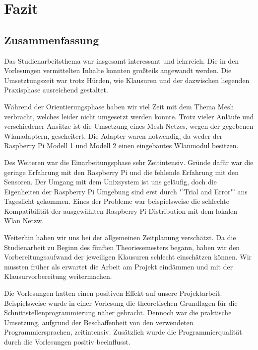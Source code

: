 \chapter{Fazit}
%
\section{Zusammenfassung}
	Das Studienarbeitsthema war insgesamt interessant und lehrreich. Die in den Vorlesungen vermittelten Inhalte konnten großteils angewandt werden. Die Umsetztungszeit war trotz Hürden, wie Klausuren und der dazwischen liegenden Praxisphase ausreichend gestaltet. 
	
	Während der	Orientierungsphase haben wir viel Zeit mit dem Thema Mesh verbracht, welches leider nicht umgesetzt werden konnte. Trotz vieler Anläufe und verschiedener Ansätze ist die Umsetzung eines Mesh Netzes, wegen der gegebenen Wlanadaptern, gescheitert. Die Adapter waren notwendig, da weder der Raspberry Pi Modell 1 und Modell 2 einen eingebautes Wlanmodul besitzen. 
	
	Des Weiteren war die Einarbeitungsphase sehr Zeitintensiv. Gründe dafür war die geringe Erfahrung mit den Raspberry Pi und die fehlende Erfahrung mit den Sensoren. Der Umgang mit dem Unixsystem ist uns geläufig, doch die Eigenheiten der Raspberry Pi Umgebung sind erst durch "'Trial and Error"' ans Tageslicht gekommen. Eines der Probleme war beispielsweise die schlechte Kompatibilität der ausgewählten Raspberry Pi Distribution mit dem lokalen Wlan Netzw. 
	
	Weiterhin haben wir uns bei der allgemeinen Zeitplanung verschätzt. Da die Studienarbeit zu Beginn des fünften Theoriesemesters begann, haben wir den Vorbereitungsaufwand der jeweiligen Klausuren schlecht einschätzen können. Wir mussten früher als erwartet die Arbeit am Projekt eindämmen und mit der Klausurvorbereitung weitermachen. 
	
	Die Vorlesungen hatten einen positiven Effekt auf unsere Projektarbeit. Beispielsweise wurde in einer Vorlesung die theoretischen Grundlagen für die Schnittstellenprogrammierung näher gebracht. Dennoch war die praktische Umsetzung, aufgrund der Beschaffenheit von den verwendeten Programmiersprachen, zeitintensiv. Zusätzlich wurde die Programmierqualität durch die Vorlesungen positiv beeinflusst.
	
